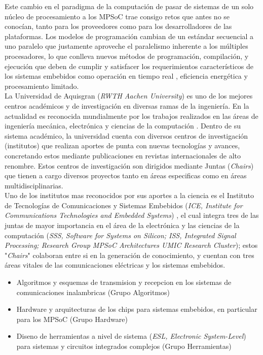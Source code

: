 Este cambio en el paradigma de la computación de pasar de sistemas de un solo núcleo de procesamiento a los MPSoC trae consigo retos 
que antes no se conocían, tanto para los proveedores como para los desarrolladores de las plataformas. Los modelos de programación cambian 
de un estándar secuencial a uno paralelo que justamente aproveche el paralelismo inherente a los múltiples procesadores,
lo que conlleva nuevos métodos de programación, compilación, y ejecución que deben de cumplir y satisfacer los requerimientos 
característicos de los sistemas embebidos como operación en tiempo real \cite{LERTA_RT}, eficiencia energética y procesamiento limitado.\\

La Universidad de Aquisgran (\textit{RWTH Aachen University}) es uno de los mejores centros académicos y de investigación en diversas
ramas de la ingeniería. En la actualidad es reconocida mundialmente por los trabajos realizados en las áreas de ingeniería mecánica, 
electrónica y ciencias de la computación \cite{RWTH_AACHEN_REF}. Dentro de su sistema académico, la universidad cuenta con diversos centros
de investigación (institutos) que realizan aportes de punta con nuevas tecnologías y avances, concretando estos mediante publicaciones en revistas
internacionales de alto renombre. Estos centros de investigación son dirigidos mediante Juntas (\textit{Chairs}) 
que tienen a cargo diversos proyectos tanto en áreas especificas como en áreas multidisciplinarias.\\

Uno de los institutos mas reconocidos por sus aportes a la ciencia es el Instituto de Tecnologías de Comunicaciones y 
Sistemas Embebidos (\textit{ICE, Institute for Communications Technologies and Embedded Systems}) \cite{ICE_ABOUT}, 
el cual integra tres de las juntas de mayor importancia en el área de la electrónica y las ciencias 
de la computación (\textit{SSS, Software for Systems on Silicon; ISS, Integrated Signal Processing; Research Group 
MPSoC Architectures UMIC Research Cluster}); estos "\textit{Chairs}" colaboran entre si en la generación de conocimiento, y cuentan con 
tres áreas vitales de las comunicaciones eléctricas y los sistemas embebidos. 

\begin{itemize}
 \item Algoritmos y esquemas de transmision y recepcion en los sistemas de comunicaciones inalambricas (Grupo Algoritmos)
 \item Hardware y arquitecturas de los chips para sistemas embebidos, en particular para los MPSoC (Grupo Hardware)
 \item Diseno de herramientas a nivel de sistema (\textit{ESL, Electronic System-Level}) para sistemas y circuitos integrados complejos
 (Grupo Herramientas)
\end{itemize}


